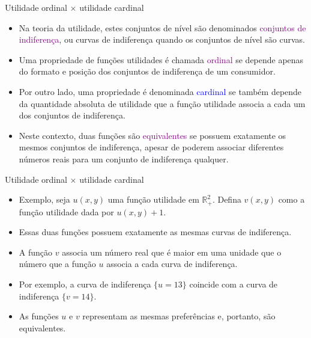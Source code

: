 \documentclass[10pt]{beamer}
\begin{document}
\begin{frame}{Utilidade ordinal $\times$ utilidade cardinal}
    \begin{itemize}
        \item Na teoria da utilidade, estes conjuntos de nível são denominados \textcolor{purple}{conjuntos de indiferença}, ou curvas de indiferença quando os conjuntos de nível são curvas.
        \bigskip
        \item Uma propriedade de funções utilidades é chamada \textcolor{purple}{ordinal} se depende apenas do formato e posição dos conjuntos de indiferença de um consumidor.
        \bigskip
        \item Por outro lado, uma propriedade é denominada \textcolor{blue}{cardinal} se também depende da quantidade absoluta de utilidade que a função utilidade associa a cada um dos conjuntos de indiferença.
        \bigskip
        \item Neste contexto, duas funções são \textcolor{purple}{equivalentes} se possuem exatamente os mesmos conjuntos de indiferença, apesar de poderem associar diferentes números reais para um conjunto de indiferença qualquer.        
    \end{itemize}    
\end{frame}

\begin{frame}{Utilidade ordinal $\times$ utilidade cardinal}
    \begin{itemize}
        \item Exemplo, seja $u(x,y)$ uma função utilidade em $\mathbb{R}_+^2$. Defina $v(x,y)$ como a função utilidade dada por $u(x,y) + 1$.
        \bigskip
        \item Essas duas funções possuem exatamente as mesmas curvas de indiferença.
        \bigskip
        \item A função $v$ associa um número real que é maior em uma unidade que o número que a função $u$ associa a cada curva de indiferença.
        \bigskip
        \item Por exemplo, a curva de indiferença $\{u = 13\}$ coincide com a curva de indiferença $\{v = 14\}$.
        \bigskip
        \item As funções $u$ e $v$ representam as mesmas preferências e, portanto, são equivalentes.
    \end{itemize}    
\end{frame}
\end{document}

